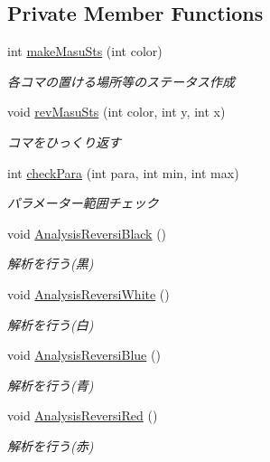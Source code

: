 \subsection*{Private Member Functions}
\begin{DoxyCompactItemize}
\item 
int \hyperlink{class_reversi4color_form_1_1_my_reversi_afdfd5f0fc3a4ed4e24bcf67ead0bb980}{make\+Masu\+Sts} (int color)
\begin{DoxyCompactList}\small\item\em 各コマの置ける場所等のステータス作成 \end{DoxyCompactList}\item 
void \hyperlink{class_reversi4color_form_1_1_my_reversi_a94536b8feaa37ca51b3d0612befae12f}{rev\+Masu\+Sts} (int color, int y, int x)
\begin{DoxyCompactList}\small\item\em コマをひっくり返す \end{DoxyCompactList}\item 
int \hyperlink{class_reversi4color_form_1_1_my_reversi_a02c145ac89302f2360cdb0c0391a38ce}{check\+Para} (int para, int min, int max)
\begin{DoxyCompactList}\small\item\em パラメーター範囲チェック \end{DoxyCompactList}\item 
void \hyperlink{class_reversi4color_form_1_1_my_reversi_ae4c0b7e9a3cedba827facf1d96b654f0}{Analysis\+Reversi\+Black} ()
\begin{DoxyCompactList}\small\item\em 解析を行う(黒) \end{DoxyCompactList}\item 
void \hyperlink{class_reversi4color_form_1_1_my_reversi_a61ca891ff78c7357ab077ce7bd3cbf97}{Analysis\+Reversi\+White} ()
\begin{DoxyCompactList}\small\item\em 解析を行う(白) \end{DoxyCompactList}\item 
void \hyperlink{class_reversi4color_form_1_1_my_reversi_a07c18a7adbcc3bd0993673f0a8f63c85}{Analysis\+Reversi\+Blue} ()
\begin{DoxyCompactList}\small\item\em 解析を行う(青) \end{DoxyCompactList}\item 
void \hyperlink{class_reversi4color_form_1_1_my_reversi_a2d0c12ed7036def583e06ca4df37f367}{Analysis\+Reversi\+Red} ()
\begin{DoxyCompactList}\small\item\em 解析を行う(赤) \end{DoxyCompactList}\end{DoxyCompactItemize}
